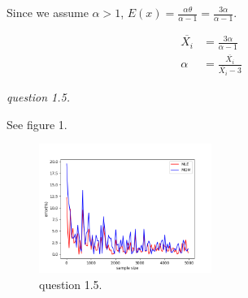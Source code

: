\documentclass{article}
\begin{document}
Since we assume $\alpha>1$, $E(x)=\frac{\alpha\theta}{\alpha-1}=\frac{3\alpha}{\alpha-1}$.

\begin{align*}
    \overline{X_i}&=\frac{3\alpha}{\alpha-1}\\
    \alpha&=\frac{\overline{X_i}}{\overline{X_i}-3}
\end{align*}

\vspace{\baselineskip}
\textit{question 1.5.}

See figure 1.

\begin{figure}[H]
    \centering
        \includegraphics[width=0.5\textwidth]{2-1-5}
    \caption{question 1.5.}
    \label{fig:1-5}
\end{figure}
\end{document}
